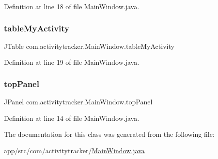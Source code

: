 Definition at line 18 of file Main\+Window.\+java.

\mbox{\label{classcom_1_1activitytracker_1_1_main_window_a0ad6d3ca1298275eba15a9ea189d4d9b}} 
\subsubsection{\texorpdfstring{table\+My\+Activity}{tableMyActivity}}
{\footnotesize\ttfamily J\+Table com.\+activitytracker.\+Main\+Window.\+table\+My\+Activity\hspace{0.3cm}{\ttfamily [private]}}



Definition at line 19 of file Main\+Window.\+java.

\mbox{\label{classcom_1_1activitytracker_1_1_main_window_a6baf76b2b8ede1ba82fc6d096ddb580b}} 
\subsubsection{\texorpdfstring{top\+Panel}{topPanel}}
{\footnotesize\ttfamily J\+Panel com.\+activitytracker.\+Main\+Window.\+top\+Panel\hspace{0.3cm}{\ttfamily [private]}}



Definition at line 14 of file Main\+Window.\+java.



The documentation for this class was generated from the following file\+:\begin{DoxyCompactItemize}
\item 
app/src/com/activitytracker/\mbox{\hyperlink{_main_window_8java}{Main\+Window.\+java}}\end{DoxyCompactItemize}
